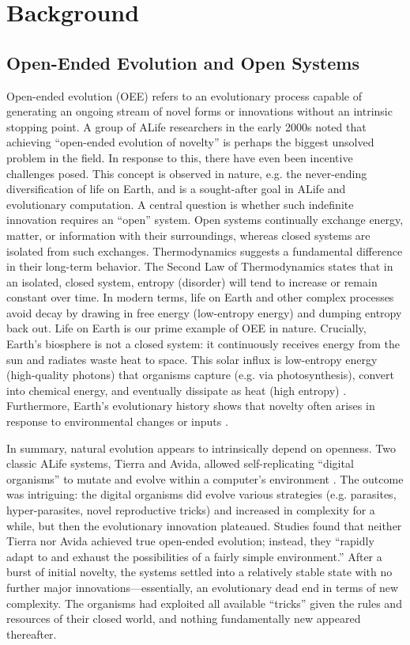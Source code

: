 \section{Background}
\subsection{Open-Ended Evolution and Open Systems}
Open-ended evolution (OEE) \cite{Packard2019OpenEnded} refers to an evolutionary process capable of generating an ongoing stream of novel forms or innovations without an intrinsic stopping point. A group of ALife researchers in the early 2000s noted that achieving ``open-ended evolution of novelty'' is perhaps the biggest unsolved problem in the field. \cite{stanley2017openendedness}
In response to this, there have even been incentive challenges posed. This concept is observed in nature, e.g. the never-ending diversification of life on Earth, and is a sought-after goal in ALife and evolutionary computation. A central question is whether such indefinite innovation requires an ``open'' system.
Open systems continually exchange energy, matter, or information with their surroundings, whereas closed systems are isolated from such exchanges. Thermodynamics suggests a fundamental difference in their long-term behavior. The Second Law of Thermodynamics states that in an isolated, closed system, entropy (disorder) will tend to increase or remain constant over time.  In modern terms, life on Earth and other complex processes avoid decay by drawing in free energy (low-entropy energy) and dumping entropy back out. Life on Earth is our prime example of OEE in nature. Crucially, Earth's biosphere is not a closed system: it continuously receives energy from the sun and radiates waste heat to space. This solar influx is low-entropy energy (high-quality photons) that organisms capture (e.g. via photosynthesis), convert into chemical energy, and eventually dissipate as heat (high entropy) . Furthermore, Earth’s evolutionary history shows that novelty often arises in response to environmental changes or inputs \cite{Bedau2003Artificial}. %

In summary, natural evolution appears to intrinsically depend on openness. Two classic ALife systems, Tierra and Avida, allowed self-replicating ``digital organisms'' to mutate and evolve within a computer's environment \cite{Packard2019a}. The outcome was intriguing: the digital organisms did evolve various strategies (e.g. parasites, hyper-parasites, novel reproductive tricks) and increased in complexity for a while, but then the evolutionary innovation plateaued. Studies found that neither Tierra nor Avida achieved true open-ended evolution; instead, they ``rapidly adapt to and exhaust the possibilities of a fairly simple environment.'' After a burst of initial novelty, the systems settled into a relatively stable state with no further major innovations---essentially, an evolutionary dead end in terms of new complexity. The organisms had exploited all available ``tricks'' given the rules and resources of their closed world, and nothing fundamentally new appeared thereafter.

